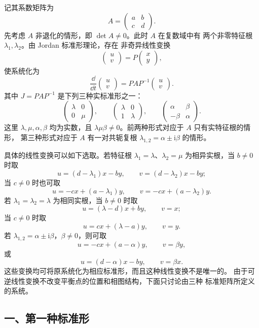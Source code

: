 记其系数矩阵为
\[
	A=\begin{pmatrix}a&b\\c&d\end{pmatrix}.
\]
先考虑 $A$ 非退化的情形，即 $\det A\neq0$。此时 $A$ 在复数域中有
两个非零特征根 $\lambda_1,\lambda_2$。由 Jordan 标准形理论，存在
非奇异线性变换
\[
	\begin{pmatrix}u\\v\end{pmatrix}
	=P\begin{pmatrix}x\\y\end{pmatrix},
\]
使系统化为
\[
	\dfrac{\dd}{\dd t}\begin{pmatrix}u\\v\end{pmatrix}
	=PAP^{-1}\begin{pmatrix}u\\v\end{pmatrix}.
\]
其中 $J=PAP^{-1}$ 是下列三种实标准形之一：
\[
	\begin{pmatrix}\lambda&0\\0&\mu\end{pmatrix},
	\qquad
	\begin{pmatrix}\lambda&0\\1&\lambda\end{pmatrix},
	\qquad
	\begin{pmatrix}\alpha&\beta\\-\beta&\alpha\end{pmatrix}.
\]
这里 $\lambda,\mu,\alpha,\beta$ 均为实数，且
$\lambda\mu\beta\neq0$。前两种形式对应于 $A$ 只有实特征根的情形，
第三种形式对应于 $A$ 有一对共轭复根
$\lambda_{1,2}=\alpha\pm\mathrm{i}\beta$ 的情形。

具体的线性变换可以如下选取。若特征根
$\lambda_1=\lambda$、$\lambda_2=\mu$ 为相异实根，当 $b\neq0$ 时取
\[
	u=(d-\lambda_1)x-by,
	\qquad
	v=(d-\lambda_2)x-by;
\]
当 $c\neq0$ 时也可取
\[
	u=-cx+(a-\lambda_1)y,
	\qquad
	v=-cx+(a-\lambda_2)y.
\]
若 $\lambda_1=\lambda_2=\lambda$ 为相同实根，当 $b\neq0$ 时取
\[
	u=(\lambda-d)x+by,
	\qquad v=x;
\]
当 $c\neq0$ 时取
\[
	u=cx+(\lambda-a)y,
	\qquad v=y.
\]
若 $\lambda_{1,2}=\alpha\pm\mathrm{i}\beta$，$\beta\neq0$，则可取
\[
	u=-cx+(a-\alpha)y,
	\qquad v=\beta y,
\]
或
\[
	u=(d-\alpha)x-by,
	\qquad v=\beta x.
\]
这些变换均可将原系统化为相应标准形，而且这种线性变换不是唯一的。
由于可逆线性变换不改变平衡点的位置和相图结构，下面只讨论由三种
标准矩阵所定义的系统。

\subsection*{一、第一种标准形}

